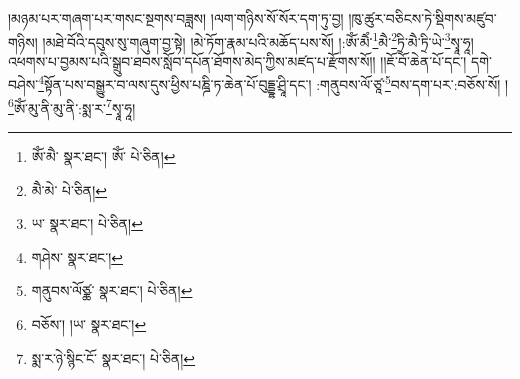 །མཉམ་པར་གཞག་པར་གསང་སྔགས་བཟླས། །ལག་གཉིས་སོ་སོར་དག་ཏུ་བྱ། །ཁུ་ཚུར་བཅིངས་ཏེ་སྡིགས་མཛུབ་གཉིས། །མཐེ་བོའི་དབུས་སུ་གཞུག་བྱ་སྟེ། །མེ་ཏོག་རྣམ་པའི་མཆོད་པས་སོ། །:ཨོཾ་མཻཾ་\footnote{ཨོཾ་མཻ་  སྣར་ཐང་། ཨོཾ་  པེ་ཅིན། }མཻ་\footnote{མཻ་མེ་  པེ་ཅིན། }ཏྲི་མཻ་ཏྲི་ཡེ་\footnote{ཡ་  སྣར་ཐང་།  པེ་ཅིན། }སྭཱ་ཧཱ། འཕགས་པ་བྱམས་པའི་སྒྲུབ་ཐབས་སློབ་དཔོན་ཐོགས་མེད་ཀྱིས་མཛད་པ་རྫོགས་སོ།། །།ཇོ་བོ་ཆེན་པོ་དང་། དགེ་བཤེས་\footnote{གཤེས་  སྣར་ཐང་། }སྟོན་པས་བསྒྱུར་བ་ལས་དུས་ཕྱིས་པཎྜི་ཏ་ཆེན་པོ་བུདྡྷ་ཤྲཱི་དང་། :གནུབས་ལོ་ཙཱ་\footnote{གནུབས་ལོཙྪ་  སྣར་ཐང་།  པེ་ཅིན། }བས་དག་པར་:བཅོས་སོ། །\footnote{བཅོས་། །ཡ་  སྣར་ཐང་། }ཨོཾ་མུ་ནི་མུ་ནི་:སྨ་ར་\footnote{སྨ་ར་ཉེ་སྙིང་ངོ་  སྣར་ཐང་།  པེ་ཅིན། }སྭཱ་ཧཱ། 